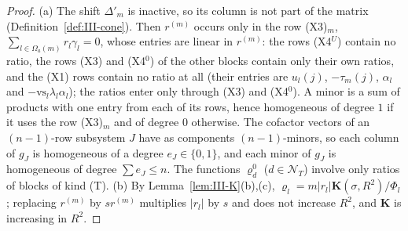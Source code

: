 \documentclass[10pt]{amsart}
\theoremstyle{definition}
\theoremstyle{remark}
\begin{document}
\begin{proof}
(a) The shift $\Delta'_m$ is inactive, so its column is not part of the
matrix (Definition~\ref{def:III-cone}).  Then $r^{(m)}$ occurs only in the
row (X3)$_m$, $\sum_{l\in\Omega_a(m)}r_l\gamma_l=0$, whose entries are linear
in $r^{(m)}$: the rows (X4$^U$) contain no ratio, the rows (X3) and
(X4$^0$) of the other blocks contain only their own ratios, and the (X1)
rows contain no ratio at all (their entries are $u_l(j)$, $-\tau_m(j)$,
$\alpha_l$ and $-\mathrm{vs}_l\lambda_l\alpha_l$); the ratios enter only
through (X3) and (X4$^0$).  A minor is a sum
of products with one entry from each of its rows, hence homogeneous of
degree $1$ if it uses the row (X3)$_m$ and of degree $0$ otherwise.  The
cofactor vectors of an $(n-1)$-row subsystem $J$ have as components
$(n-1)$-minors, so each column of $g_J$ is homogeneous of a degree
$e_J\in\{0,1\}$, and each minor of $g_J$ is homogeneous of degree $\sum e_J\le
n$.  The functions $\varrho^0_d$ ($d\in\mathcal N_T$) involve only ratios of
blocks of kind (T).  (b) By Lemma~\ref{lem:III-K}(b),(c), $\varrho_l=m|r_l|\mathbf
K(\sigma,R^2)/\Phi_l$; replacing $r^{(m)}$ by $sr^{(m)}$ multiplies $|r_l|$ by $s$
and does not increase $R^2$, and $\mathbf K$ is increasing in $R^2$.
\end{proof}
\end{document}
